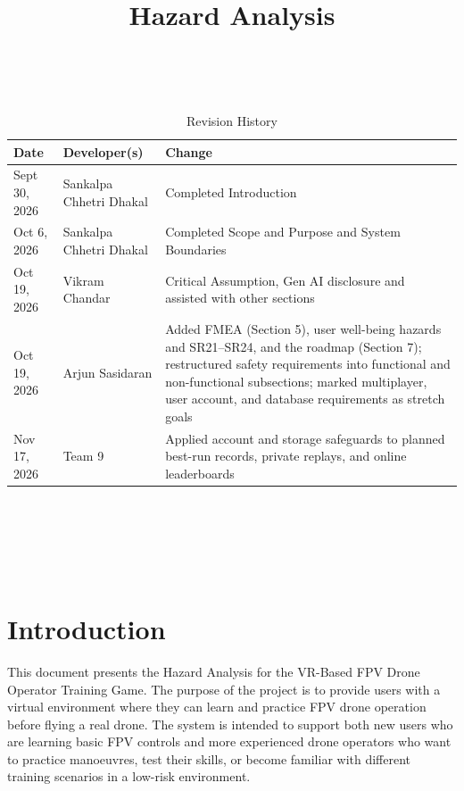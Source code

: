 \documentclass{article}
\title{Hazard Analysis\\\progname}
\author{\authname}
\date{}
\begin{document}
\maketitle
\thispagestyle{empty}

~\newpage


\begin{table}[hp]
\caption{Revision History} \label{TblRevisionHistory}
\begin{tabularx}{\textwidth}{llX}
\toprule
\textbf{Date} & \textbf{Developer(s)} & \textbf{Change}\\
\midrule
Sept 30, 2026 & Sankalpa Chhetri Dhakal & Completed Introduction\\
Oct 6, 2026 & Sankalpa Chhetri Dhakal & Completed Scope and Purpose and System Boundaries\\
Oct 19, 2026 & Vikram Chandar & Critical Assumption, Gen AI disclosure and assisted with other sections\\
Oct 19, 2026 & Arjun Sasidaran & Added FMEA (Section 5), user well-being
hazards and SR21--SR24, and the roadmap (Section 7); restructured safety
requirements into functional and non-functional subsections; marked
multiplayer, user account, and database requirements as stretch goals\\
Nov 17, 2026 & Team 9 & Applied account and storage safeguards to planned best-run records, private replays, and online leaderboards\\
\bottomrule
\end{tabularx}
\end{table}

~\newpage

\enlargethispage{6\baselineskip}
\tableofcontents

~\newpage

\listoftables

~\newpage


\section{Introduction}

This document presents the Hazard Analysis for the VR-Based FPV Drone Operator
Training Game. The purpose of the project is to provide users with a virtual
environment where they can learn and practice FPV drone operation before flying
a real drone. The system is intended to support both new users who are learning basic 
FPV controls and more experienced drone operators who want to practice manoeuvres, test 
their skills, or become familiar with different training scenarios in a low-risk environment.
\end{document}
